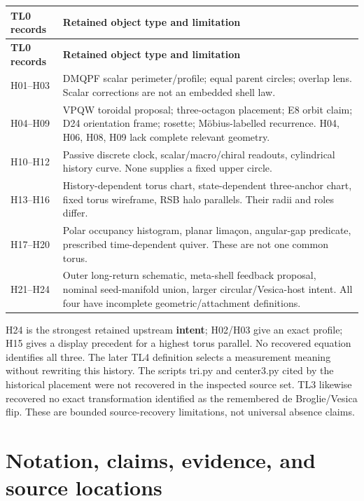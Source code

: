 \documentclass[11pt,a4paper]{article}
\begin{document}
\begingroup\small\setlength{\LTpre}{5pt}\setlength{\LTpost}{7pt}
\begin{longtable}{@{}>{\raggedright\arraybackslash}p{0.3200\dimexpr\textwidth-12pt\relax}>{\raggedright\arraybackslash}p{0.6800\dimexpr\textwidth-12pt\relax}@{}}
\toprule
\textbf{TL0 records} & \textbf{Retained object type and limitation}\\ \midrule
\endfirsthead
\textbf{TL0 records} & \textbf{Retained object type and limitation}\\ \midrule
\endhead
\bottomrule\endfoot
H01--H03 & DMQPF scalar perimeter/\allowbreak{}profile; equal parent circles; overlap lens. Scalar corrections are not an embedded shell law.\\[4pt]
H04--H09 & VPQW toroidal proposal; three-octagon placement; E8 orbit claim; D24 orientation frame; rosette; Möbius-labelled recurrence. H04, H06, H08, H09 lack complete relevant geometry.\\[4pt]
H10--H12 & Passive discrete clock, scalar/\allowbreak{}macro/\allowbreak{}chiral readouts, cylindrical history curve. None supplies a fixed upper circle.\\[4pt]
H13--H16 & History-dependent torus chart, state-dependent three-anchor chart, fixed torus wireframe, RSB halo parallels. Their radii and roles differ.\\[4pt]
H17--H20 & Polar occupancy histogram, planar limaçon, angular-gap predicate, prescribed time-dependent quiver. These are not one common torus.\\[4pt]
H21--H24 & Outer long-return schematic, meta-shell feedback proposal, nominal seed-manifold union, larger circular/\allowbreak{}Vesica-host intent. All four have incomplete geometric/\allowbreak{}attachment definitions.\\[4pt]
\end{longtable}\endgroup

H24 is the strongest retained upstream \textbf{intent}; H02/\allowbreak{}H03 give an exact profile; H15 gives a display precedent for a highest torus parallel. No recovered equation identifies all three. The later TL4 definition selects a measurement meaning without rewriting this history. The scripts tri.py and center3.py cited by the historical placement were not recovered in the inspected source set. TL3 likewise recovered no exact transformation identified as the remembered de Broglie/\allowbreak{}Vesica flip. These are bounded source-recovery limitations, not universal absence claims.

\section{Notation, claims, evidence, and source locations}
\end{document}
